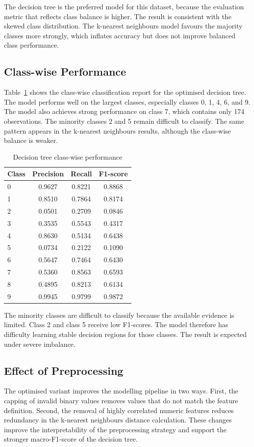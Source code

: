 \documentclass[conference,10pt]{IEEEtran}
\begin{document}
The decision tree is the preferred model for this dataset, because the evaluation metric that reflects class balance is higher. The result is consistent with the skewed class distribution. The k-nearest neighbours model favours the majority classes more strongly, which inflates accuracy but does not improve balanced class performance.

\subsection{Class-wise Performance}
Table~\ref{tab:dt_classwise} shows the class-wise classification report for the optimised decision tree. The model performs well on the largest classes, especially classes 0, 1, 4, 6, and 9. The model also achieves strong performance on class 7, which contains only 174 observations. The minority classes 2 and 5 remain difficult to classify. The same pattern appears in the k-nearest neighbours results, although the class-wise balance is weaker.

\begin{table}[H]
\caption{Decision tree class-wise performance}
\label{tab:dt_classwise}
\centering
\begin{tabular}{lccc}
\toprule
Class & Precision & Recall & F1-score \\
\midrule
0 & 0.9627 & 0.8221 & 0.8868 \\
1 & 0.8510 & 0.7864 & 0.8174 \\
2 & 0.0501 & 0.2709 & 0.0846 \\
3 & 0.3535 & 0.5543 & 0.4317 \\
4 & 0.8630 & 0.5134 & 0.6438 \\
5 & 0.0734 & 0.2122 & 0.1090 \\
6 & 0.5647 & 0.7464 & 0.6430 \\
7 & 0.5360 & 0.8563 & 0.6593 \\
8 & 0.4895 & 0.8213 & 0.6134 \\
9 & 0.9945 & 0.9799 & 0.9872 \\
\bottomrule
\end{tabular}
\end{table}

The minority classes are difficult to classify because the available evidence is limited. Class 2 and class 5 receive low F1-scores. The model therefore has difficulty learning stable decision regions for those classes. The result is expected under severe imbalance.

\subsection{Effect of Preprocessing}
The optimised variant improves the modelling pipeline in two ways. First, the capping of invalid binary values removes values that do not match the feature definition. Second, the removal of highly correlated numeric features reduces redundancy in the k-nearest neighbours distance calculation. These changes improve the interpretability of the preprocessing strategy and support the stronger macro-F1-score of the decision tree.
\end{document}
